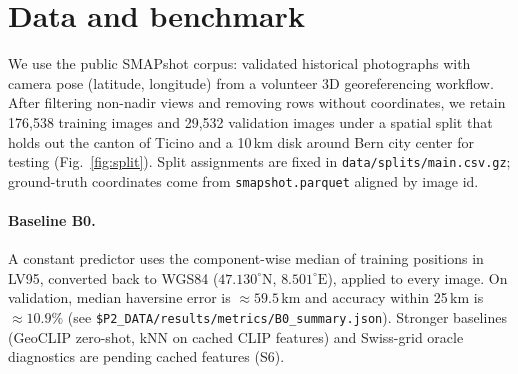 \section{Data and benchmark}
\label{sec:data}

We use the public SMAPshot corpus: validated historical photographs with camera pose (latitude, longitude) from a volunteer 3D georeferencing workflow.
After filtering non-nadir views and removing rows without coordinates, we retain 176{,}538 training images and 29{,}532 validation images under a spatial split that holds out the canton of Ticino and a 10\,km disk around Bern city center for testing (Fig.~\ref{fig:split}).
Split assignments are fixed in \texttt{data/splits/main.csv.gz}; ground-truth coordinates come from \texttt{smapshot.parquet} aligned by image id.

\paragraph{Baseline B0.}
A constant predictor uses the component-wise median of training positions in LV95, converted back to WGS84 ($47.130^\circ\mathrm{N}$, $8.501^\circ\mathrm{E}$), applied to every image.
On validation, median haversine error is $\approx 59.5$\,km and accuracy within 25\,km is $\approx 10.9\%$ (see \texttt{\$P2\_DATA/results/metrics/B0\_summary.json}).
Stronger baselines (GeoCLIP zero-shot, kNN on cached CLIP features) and Swiss-grid oracle diagnostics are pending cached features (S6).